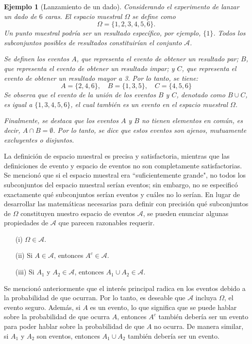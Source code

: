 \documentclass[12pt]{article}
\newtheorem*{example}{Ejemplo}
\begin{document}
\begin{example}[Lanzamiento de un dado]
   Considerando el experimento de lanzar un dado de $6$ caras. El espacio muestral $\Omega$ se define como 
   $$\Omega = \{1, 2, 3, 4, 5, 6\}.$$ 
   Un punto muestral podría ser un resultado específico, por ejemplo, $\{1\}$. Todos los subconjuntos posibles de resultados constituirían el conjunto $\mathscr{A}$.

Se definen los eventos $A$, que representa el evento de obtener un resultado par; $B$, que representa el evento de obtener un resultado impar; y $C$, que representa el evento de obtener un resultado mayor a 3. Por lo tanto, se tiene:
    $$A=\{2,4,6\}, \quad B=\{1,3,5\}, \quad C=\{4,5,6\}$$
    Se observa que el evento de la unión de los eventos $B$ y $C$, denotado como $B\cup C$, es igual a $\{1, 3, 4, 5, 6\}$, el cual también es un evento en el espacio muestral $\Omega$.

Finalmente, se destaca que los eventos $A$ y $B$ no tienen elementos en común, es decir, $A \cap B = \emptyset$. Por lo tanto, se dice que estos eventos son ajenos, mutuamente excluyentes o disjuntos.
\end{example}

La definición de espacio muestral es precisa y satisfactoria, mientras que las definiciones de evento y espacio de eventos no son completamente satisfactorias. Se mencionó que si el espacio muestral era ``suficientemente grande", no todos los subconjuntos del espacio muestral serían eventos; sin embargo, no se especificó exactamente qué subconjuntos serían eventos y cuáles no lo serían. En lugar de desarrollar las matemáticas necesarias para definir con precisión qué subconjuntos de $\Omega$ constituyen nuestro espacio de eventos $\mathscr A$, se pueden enunciar algunas propiedades de $\mathscr A$ que parecen razonables requerir.

\begin{itemize}
    \item[(i)] $\Omega \in \mathscr A$.
    \item[(ii)] Si $A\in\mathscr A$, entonces $A^c\in \mathscr A$.
    \item[(iii)] Si $A_1$ y $A_2\in \mathscr A$, entonces $A_1\cup A_2\in \mathscr A$.
\end{itemize}
Se mencionó anteriormente que el interés principal radica en los eventos debido a la probabilidad de que ocurran. Por lo tanto, es deseable que $\mathscr A$ incluya $\Omega$, el evento seguro. Además, si $A$ es un evento, lo que significa que se puede hablar sobre la probabilidad de que ocurra $A$, entonces $A^c$ también debería ser un evento para poder hablar sobre la probabilidad de que $A$ no ocurra. De manera similar, si $A_1$ y $A_2$ son eventos, entonces $A_1\cup A_2$ también debería ser un evento.\\
\end{document}
